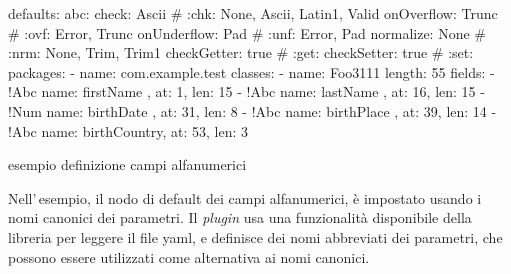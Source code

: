 \documentclass[a4paper,10pt]{report}
\newif\ifesource
\newenvironment{elisting}[1][H]
  {\captionsetup{aboveskip=0pt}\begin{listing}[#1]}
  {\end{listing}%
}
\begin{document}
\ifesource
\begin{figure*}[!htb]
\begin{lstlisting}[language=yaml, caption={esempio definizione campi alfanumerici}, 
label=lst:xmplAbc]
defaults:
  abc:
    check: Ascii        # :chk: None, Ascii, Latin1, Valid
    onOverflow: Trunc   # :ovf: Error, Trunc
    onUnderflow: Pad    # :unf: Error, Pad
    normalize: None     # :nrm: None, Trim, Trim1
    checkGetter: true   # :get:
    checkSetter: true   # :set:
packages:
  - name: com.example.test
    classes:
      - name: Foo3111
        length: 50
        fields:
          - !Abc { name: cognome    , at:   1, len:    25 }
          - !Abc { name: nome       , at:  26, len:    20 }
          - !Abc { name: stCivile   , at:  46, len:     1 }
          - !Abc { name: nazionalita, at:  47, len:     3 }
          - !Abc { name: sesso      , at:  50, len:     1 }
\end{lstlisting}
\end{figure*}
\else
\begin{elisting}[!htb]
\begin{yamlcode}
defaults:
  abc:
    check: Ascii        # :chk: None, Ascii, Latin1, Valid
    onOverflow: Trunc   # :ovf: Error, Trunc
    onUnderflow: Pad    # :unf: Error, Pad
    normalize: None     # :nrm: None, Trim, Trim1
    checkGetter: true   # :get:
    checkSetter: true   # :set:
packages:
  - name: com.example.test
    classes:
      - name: Foo3111
        length: 55
        fields:
          - !Abc { name: firstName   , at:  1, len: 15 }
          - !Abc { name: lastName    , at: 16, len: 15 }
          - !Num { name: birthDate   , at: 31, len:  8 }
          - !Abc { name: birthPlace  , at: 39, len: 14 }
          - !Abc { name: birthCountry, at: 53, len:  3 }
\end{yamlcode}
\caption{esempio definizione campi alfanumerici}
\label{lst:xmplAbc}
\end{elisting}
\fi

Nell'\,esempio, il nodo di default dei campi alfanumerici, è impostato usando
i nomi canonici dei parametri. Il \textit{plugin} usa una funzionalità 
disponibile della libreria per leggere il file yaml, e definisce dei nomi
abbreviati dei parametri, che possono essere utilizzati come alternativa ai
nomi canonici.
\end{document}
